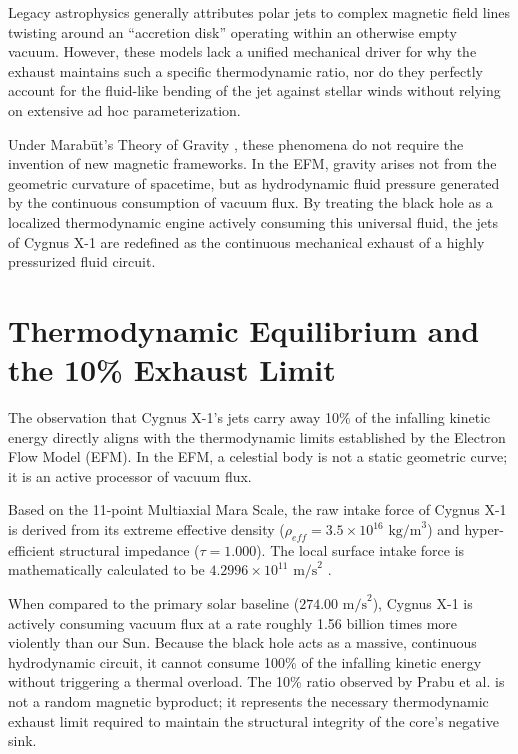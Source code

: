 \documentclass[11pt, a4paper]{article}
\begin{document}
Legacy astrophysics generally attributes polar jets to complex magnetic field lines twisting around an ``accretion disk'' operating within an otherwise empty vacuum. However, these models lack a unified mechanical driver for why the exhaust maintains such a specific thermodynamic ratio, nor do they perfectly account for the fluid-like bending of the jet against stellar winds without relying on extensive ad hoc parameterization.

Under Marab\={u}t's Theory of Gravity \cite{marabut2026}, these phenomena do not require the invention of new magnetic frameworks. In the EFM, gravity arises not from the geometric curvature of spacetime, but as hydrodynamic fluid pressure generated by the continuous consumption of vacuum flux. By treating the black hole as a localized thermodynamic engine actively consuming this universal fluid, the jets of Cygnus X-1 are redefined as the continuous mechanical exhaust of a highly pressurized fluid circuit.

\section{Thermodynamic Equilibrium and the 10\% Exhaust Limit}
The observation that Cygnus X-1's jets carry away 10\% of the infalling kinetic energy directly aligns with the thermodynamic limits established by the Electron Flow Model (EFM). In the EFM, a celestial body is not a static geometric curve; it is an active processor of vacuum flux.

Based on the 11-point Multiaxial Mara Scale, the raw intake force of Cygnus X-1 is derived from its extreme effective density ($\rho_{eff} = 3.5 \times 10^{16} \text{ kg/m}^3$) and hyper-efficient structural impedance ($\tau = 1.000$). The local surface intake force is mathematically calculated to be $4.2996 \times 10^{11} \text{ m/s}^2$ \cite{marabut2026}. 

When compared to the primary solar baseline ($274.00 \text{ m/s}^2$), Cygnus X-1 is actively consuming vacuum flux at a rate roughly 1.56 billion times more violently than our Sun. Because the black hole acts as a massive, continuous hydrodynamic circuit, it cannot consume 100\% of the infalling kinetic energy without triggering a thermal overload. The 10\% ratio observed by Prabu et al. is not a random magnetic byproduct; it represents the necessary thermodynamic exhaust limit required to maintain the structural integrity of the core's negative sink.
\end{document}
